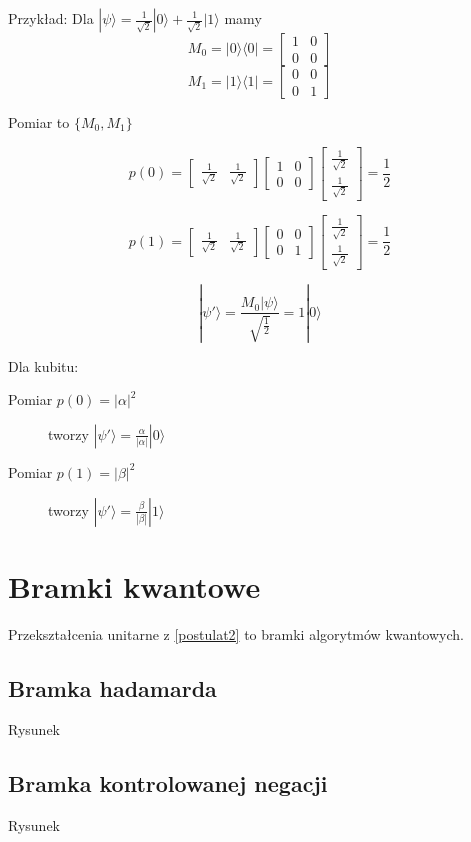 \documentclass{article}
\begin{document}
		Przykład: Dla $|\psi\rangle = \frac{1}{\sqrt{2}} |0\rangle + \frac{1}{\sqrt{2}}|1\rangle$ mamy
		$$ M_0 = |0\rangle \langle0| = \begin{bmatrix} 1 & 0 \\ 0 & 0 \end{bmatrix} $$
		$$ M_1 = |1\rangle \langle1| = \begin{bmatrix} 0 & 0 \\ 0 & 1 \end{bmatrix} $$

		Pomiar to	$ \{ M_0, M_1 \} $

		$$ p(0) = \begin{bmatrix}  \frac{1}{\sqrt{2}} &  \frac{1}{\sqrt{2}} \end{bmatrix} \begin{bmatrix} 1 & 0 \\ 0 & 0 \end{bmatrix} \begin{bmatrix} \frac{1}{\sqrt{2}} \\ \frac{1}{\sqrt{2}}  \end{bmatrix} = \frac{1}{2}$$

			$$ p(1) = \begin{bmatrix}  \frac{1}{\sqrt{2}} &  \frac{1}{\sqrt{2}} \end{bmatrix} \begin{bmatrix} 0 & 0 \\ 0 & 1 \end{bmatrix} \begin{bmatrix} \frac{1}{\sqrt{2}} \\ \frac{1}{\sqrt{2}}  \end{bmatrix} = \frac{1}{2} $$

			$$ |\psi'\rangle = \frac{M_0|\psi\rangle}{\sqrt{\frac{1}{2}}} = 1|0\rangle $$

		Dla kubitu: \begin{description}
			\item[Pomiar $ p(0) = |\alpha|^2 $] tworzy $ |\psi'\rangle = \frac{\alpha}{|\alpha|}|0\rangle $
			\item[Pomiar $ p(1) = |\beta|^2 $] tworzy $ |\psi'\rangle = \frac{\beta}{|\beta|}|1\rangle $
		\end{description}

\section{Bramki kwantowe}

Przekształcenia unitarne z \ref{postulat2} to bramki algorytmów kwantowych.

\subsection{Bramka hadamarda}

Rysunek

\subsection{Bramka kontrolowanej negacji}

Rysunek
\end{document}
